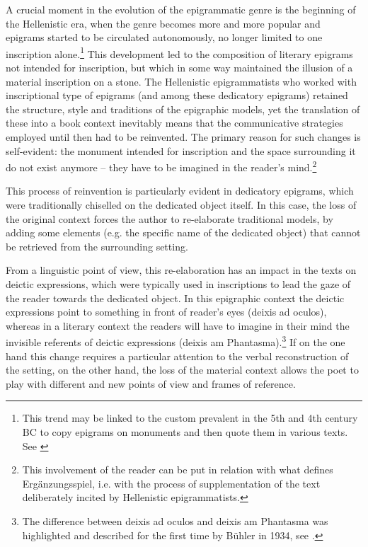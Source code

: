 \documentclass[amsthm,ebook]{saparticle}
\begin{document}
A crucial moment in the evolution of the epigrammatic genre is the beginning of the Hellenistic era, when the genre becomes more and more popular and epigrams started to be circulated autonomously, no longer limited to one
inscription alone.\footnote{ This trend may be linked to the custom prevalent in the 5th and 4th century BC to copy
epigrams on monuments and then quote them in various texts. See \citet[47ff.]{gutzwiller_poetic_1998}} This development led to the
composition of literary epigrams not intended for inscription, but which in some way maintained the illusion of a
material inscription on a stone. The Hellenistic epigrammatists who worked with inscriptional type of epigrams (and
among these dedicatory epigrams) retained the structure, style and traditions of the epigraphic models, yet the
translation of these into a book context inevitably means that the communicative strategies employed until then had to
be reinvented. The primary reason for such changes is self-evident: the monument intended for inscription and the space
surrounding it do not exist anymore – they have to be imagined in the reader's mind.\footnote{ This involvement of the
reader can be put in relation with what \citet{Bing1995} defines Ergänzungsspiel, i.e. with the process of supplementation
of the text deliberately incited by Hellenistic epigrammatists.}

This process of reinvention is particularly evident in dedicatory epigrams, which were traditionally chiselled on the
dedicated object itself. In this case, the loss of the original context forces the author to re-elaborate traditional
models, by adding some elements (e.g. the specific name of the dedicated object) that cannot be retrieved from the
surrounding setting. 

From a linguistic point of view, this re-elaboration has an impact in the texts on deictic expressions, which were
typically used in inscriptions to lead the gaze of the reader towards the dedicated object. In this epigraphic context
the deictic expressions point to something in front of reader's eyes (deixis ad oculos), whereas in a literary context
the readers will have to imagine in their mind the invisible referents of deictic expressions (deixis am
Phantasma).\footnote{ The difference between deixis ad oculos and deixis am Phantasma was highlighted and described for
the first time by Bühler in 1934, see \citet[121-126, 133-135]{buhler_sprachtheorie:_1982}.} If on the one hand this change requires a
particular attention to the verbal reconstruction of the setting, on the other hand, the loss of the material context
allows the poet to play with different and new points of view and frames of reference. 
\end{document}
